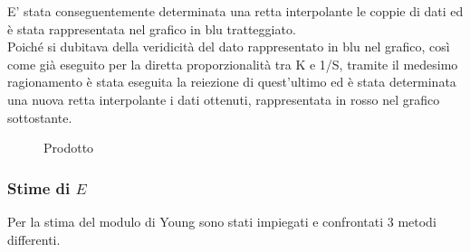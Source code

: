 \documentclass[a4paper,11pt,oneside]{article}
\begin{document}
E' stata conseguentemente determinata una retta interpolante le coppie di dati ed è stata rappresentata nel grafico in blu tratteggiato.\\
Poiché si dubitava della veridicità del dato rappresentato in blu nel grafico, così come già eseguito per la diretta proporzionalità tra K e 1/S, tramite il medesimo ragionamento è stata eseguita la reiezione di quest'ultimo ed è stata determinata una nuova retta interpolante i dati ottenuti, rappresentata in rosso nel grafico sottostante.

\begin{figure}[h!]
    \centering
        \label{fig:prodotto}
        \caption{Prodotto}
\end{figure}

\subsubsection*{Stime di $E$}
Per la stima del modulo di Young sono stati impiegati e confrontati 3 metodi differenti.
\end{document}
